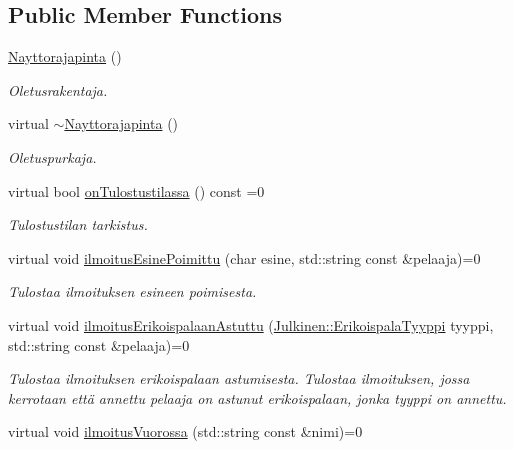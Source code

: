 \subsection*{Public Member Functions}
\begin{DoxyCompactItemize}
\item 
\hyperlink{class_julkinen_1_1_nayttorajapinta_a65c9201e902d59cdb9a089ca74670bf7}{Nayttorajapinta} ()
\begin{DoxyCompactList}\small\item\em Oletusrakentaja. \end{DoxyCompactList}\item 
virtual \hyperlink{class_julkinen_1_1_nayttorajapinta_ac38d827aa661d9c77fccb22b9bf25c9f}{$\sim$\+Nayttorajapinta} ()
\begin{DoxyCompactList}\small\item\em Oletuspurkaja. \end{DoxyCompactList}\item 
virtual bool \hyperlink{class_julkinen_1_1_nayttorajapinta_ae4d4cc62685de755e51aade02cc05424}{on\+Tulostustilassa} () const  =0
\begin{DoxyCompactList}\small\item\em Tulostustilan tarkistus. \end{DoxyCompactList}\item 
virtual void \hyperlink{class_julkinen_1_1_nayttorajapinta_afba451435164e30b22bd3060cdb09547}{ilmoitus\+Esine\+Poimittu} (char esine, std\+::string const \&pelaaja)=0
\begin{DoxyCompactList}\small\item\em Tulostaa ilmoituksen esineen poimisesta. \end{DoxyCompactList}\item 
virtual void \hyperlink{class_julkinen_1_1_nayttorajapinta_a9211bba3c7c7ed215752b8e311a5253f}{ilmoitus\+Erikoispalaan\+Astuttu} (\hyperlink{namespace_julkinen_afc26052e09d0b2214f749492cc5fff19}{Julkinen\+::\+Erikoispala\+Tyyppi} tyyppi, std\+::string const \&pelaaja)=0
\begin{DoxyCompactList}\small\item\em Tulostaa ilmoituksen erikoispalaan astumisesta. Tulostaa ilmoituksen, jossa kerrotaan että annettu pelaaja on astunut erikoispalaan, jonka tyyppi on annettu. \end{DoxyCompactList}\item 
virtual void \hyperlink{class_julkinen_1_1_nayttorajapinta_a9c54e560196f0c7e001d8fa5ee3533f2}{ilmoitus\+Vuorossa} (std\+::string const \&nimi)=0

\end{DoxyCompactItemize}
